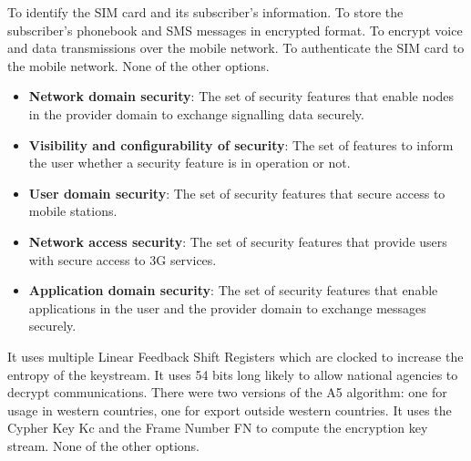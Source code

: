 \begin{checkboxes}
    \choice To identify the SIM card and its subscriber's information.
    \choice To store the subscriber's phonebook and SMS messages in encrypted format.
    \choice To encrypt voice and data transmissions over the mobile network.
    \CorrectChoice To authenticate the SIM card to the mobile network.
    \choice None of the other options.
\end{checkboxes}

\begin{solution}
    \begin{itemize}
        \item \textbf{Network domain security}: The set of security features that enable nodes in the provider domain to exchange signalling data securely.
        \item \textbf{Visibility and configurability of security}: The set of features to inform the user whether a security feature is in operation or not.
        \item \textbf{User domain security}: The set of security features that secure access to mobile stations.
        \item \textbf{Network access security}: The set of security features that provide users with secure access to 3G services.
        \item \textbf{Application domain security}: The set of security features that enable applications in the user and the provider domain to exchange messages securely.
    \end{itemize}
\end{solution}


\begin{checkboxes}
    \CorrectChoice It uses multiple Linear Feedback Shift Registers which are clocked to increase the entropy of the keystream.
    \CorrectChoice It uses 54 bits long likely to allow national agencies to decrypt communications.
    \CorrectChoice There were two versions of the A5 algorithm: one for usage in western countries, one for export outside western countries.
    \CorrectChoice It uses the Cypher Key Kc and the Frame Number FN to compute the encryption key stream.
    \choice None of the other options.
\end{checkboxes}